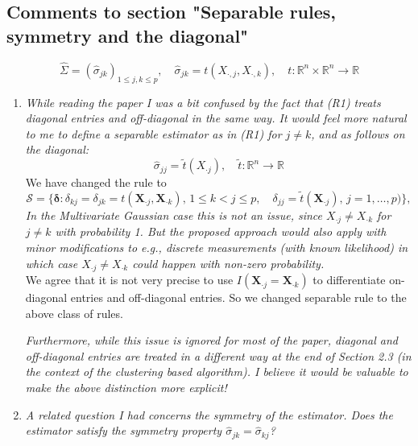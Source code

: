 \documentclass[12pt]{article}
\def\bs{\boldsymbol}
\def\bb{\mathbb}
\begin{document}
\subsection{Comments to section "Separable rules, symmetry and the diagonal"}
\begin{equation}\label{R1}
\widehat{\Sigma} = (\widehat{\sigma}_{jk})_{1\leq j,k\leq p},\quad \widehat{\sigma}_{jk} = t(X_{\cdot,j}, X_{\cdot,k}), \quad t:\bb{R}^n\times \bb{R}^n\to \bb{R}
\end{equation}
\begin{enumerate}
\item \emph{While reading the paper I was a bit confused by the fact that (R1) treats diagonal entries and off-diagonal in the same way. It would feel more natural to me to define a separable estimator as in (R1) for $j\neq k$, and as follows on the diagonal:}
$$\hat{\sigma}_{jj} = \tilde{t}(X_{\cdot j}),\quad \tilde{t}:\bb{R}^n \to \bb{R}$$
We have changed the rule to 
\begin{equation}
  \label{separable}
  \mathcal{S} = \{\bs{\delta} : \delta_{kj} = \delta_{jk} = t(\bs{X}_{\cdot j}, \bs{X}_{\cdot k}),\, 1\leq k<j\leq p,\quad 
   \delta_{jj} = \widetilde{t}(\bs{X}_{\cdot j}),\,j=1,\ldots,p)\},
\end{equation}
\emph{In the Multivariate Gaussian case this is not an issue, since $X_{\cdot j}\neq X_{\cdot k}$ for $j\neq k$ with probability 1. But the proposed approach would also apply with minor modifications to e.g., discrete measurements (with known likelihood) in which case $X_{\cdot j}\neq X_{\cdot k}$ could happen with non-zero probability.} \\
We agree that it is not very precise to use $I(\bs{X}_{\cdot j}=\bs{X}_{\cdot k})$ to differentiate on-diagonal entries and off-diagonal entries. So we changed separable rule to the above class of rules.

\emph{Furthermore, while this issue is ignored for most of the paper, diagonal and off-diagonal entries are treated in a different way at the end of Section 2.3 (in the context of the clustering based algorithm). I believe it would be valuable to make the above distinction more explicit!}
\item \emph{A related question I had concerns the symmetry of the estimator. Does the estimator satisfy the symmetry property $\hat{\sigma}_{jk} =\hat{\sigma}_{kj}$? } 


\end{enumerate}
\end{document}
